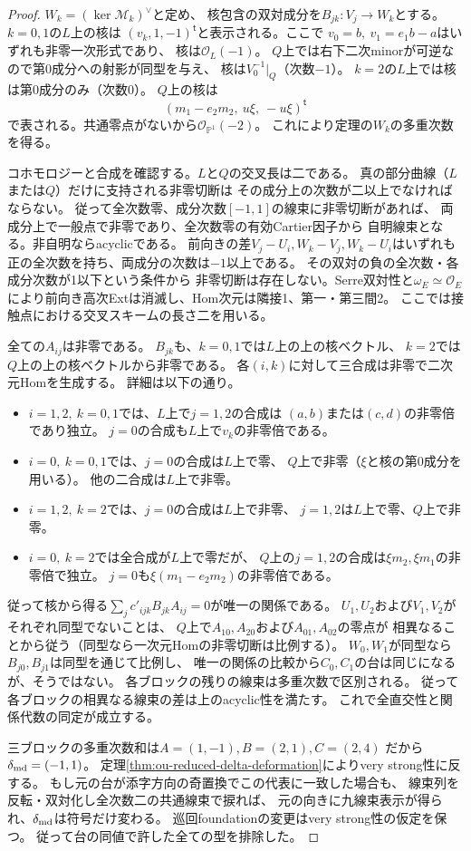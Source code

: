 \begin{proof}
$W_k=(\ker\mathscr M_k)^\vee$と定め、
核包含の双対成分を$B_{jk}:V_j\to W_k$とする。
$k=0,1$の$L$上の核は
$(v_k,1,-1)^{\mathsf t}$と表示される。ここで
$v_0=b,\ v_1=e_1 b-a$はいずれも非零一次形式であり、
核は$\mathcal O_L(-1)$。
$Q$上では右下二次minorが可逆なので第0成分への射影が同型を与え、
核は$V_0^{-1}|_Q$（次数$-1$）。
$k=2$の$L$上では核は第0成分のみ（次数0）。
$Q$上の核は
\[
 (m_1-e_2m_2,\ u\xi,\ -u\xi)^{\mathsf t}
\]
で表される。共通零点がないから$\mathcal O_{\mathbb P^1}(-2)$。
これにより定理の$W_k$の多重次数を得る。

コホモロジーと合成を確認する。$L$と$Q$の交叉長は二である。
真の部分曲線（$L$または$Q$）だけに支持される非零切断は
その成分上の次数が二以上でなければならない。
従って全次数零、成分次数$[-1,1]$の線束に非零切断があれば、
両成分上で一般点で非零であり、全次数零の有効Cartier因子から
自明線束となる。非自明ならacyclicである。
前向きの差$V_j-U_i,W_k-V_j,W_k-U_i$はいずれも
正の全次数を持ち、両成分の次数は$-1$以上である。
その双対の負の全次数・各成分次数が1以下という条件から
非零切断は存在しない。Serre双対性と$\omega_E\simeq\mathcal O_E$
により前向き高次Extは消滅し、Hom次元は隣接1、第一・第三間2。
ここでは接触点における交叉スキームの長さ二を用いる。

全ての$A_{ij}$は非零である。
$B_{jk}$も、$k=0,1$では$L$上の上の核ベクトル、
$k=2$では$Q$上の上の核ベクトルから非零である。
各$(i,k)$に対して三合成は非零で二次元Homを生成する。
詳細は以下の通り。
\begin{itemize}
 \item $i=1,2,\ k=0,1$では、$L$上で$j=1,2$の合成は
 $(a,b)$または$(c,d)$の非零倍であり独立。
 $j=0$の合成も$L$上で$v_k$の非零倍である。
 \item $i=0,\ k=0,1$では、$j=0$の合成は$L$上で零、
 $Q$上で非零（$\xi$と核の第0成分を用いる）。
 他の二合成は$L$上で非零。
 \item $i=1,2,\ k=2$では、$j=0$の合成は$L$上で非零、
 $j=1,2$は$L$上で零、$Q$上で非零。
 \item $i=0,\ k=2$では全合成が$L$上で零だが、
 $Q$上の$j=1,2$の合成は$\xi m_2,\xi m_1$の非零倍で独立。
 $j=0$も$\xi(m_1-e_2m_2)$の非零倍である。
\end{itemize}
従って核から得る$\sum_j c'_{ijk}B_{jk}A_{ij}=0$が唯一の関係である。
$U_1,U_2$および$V_1,V_2$がそれぞれ同型でないことは、
$Q$上で$A_{10},A_{20}$および$A_{01},A_{02}$の零点が
相異なることから従う（同型なら一次元Homの非零切断は比例する）。
$W_0,W_1$が同型なら$B_{j0},B_{j1}$は同型を通じて比例し、
唯一の関係の比較から$C_0,C_1$の台は同じになるが、そうではない。
各ブロックの残りの線束は多重次数で区別される。
従って各ブロックの相異なる線束の差は上のacyclic性を満たす。
これで全直交性と関係代数の同定が成立する。

三ブロックの多重次数和は$A=(1,-1), B=(2,1), C=(2,4)$
だから$\delta_{\rm md}=(-1,1)$。
定理\ref{thm:ou-reduced-delta-deformation}によりvery strong性に反する。
もし元の台が添字方向の奇置換でこの代表に一致した場合も、
線束列を反転・双対化し全次数二の共通線束で捩れば、
元の向きに九線束表示が得られ、$\delta_{\rm md}$は符号だけ変わる。
巡回foundationの変更はvery strong性の仮定を保つ。
従って台の同値で許した全ての型を排除した。
\end{proof}

